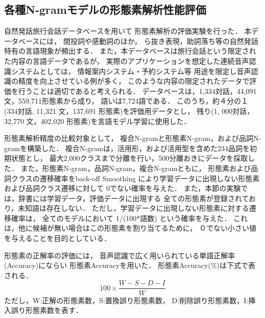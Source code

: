 \subsection{各種N-gramモデルの形態素解析性能評価}
自然発話旅行会話データベース\cite{Morimoto}を用いて
形態素解析の評価実験を行った．
本データベースには，
間投詞や感動詞のほか，
ら抜き表現，助詞落ち等の自然発話特有の言語現象が頻出する．
また，本データベースは旅行会話という限定された内容の言語データであるが，
実際のアプリケーションを想定した連続音声認識システムとしては，
情報案内システム\cite{Tsutsumi}・予約システム\cite{Kawahara}等
用途を限定し音声認識の精度を向上させている例が多く，
このような内容の限定されたデータで評価を行うことは適切であると考えられる．
データベースは，1,334対話，44,091文，559,711形態素から成り，
語いは7,724語である．
このうち，約４分の１(334対話, 11,321 文，137,691 形態素)を評価用データとし，
残り(1, 000対話，32,770 文，402,020 形態素)を言語モデル学習に使用した．

形態素解析精度の比較対象として，
複合N-gramと形態素N-gram，および品詞N-gramを構築した．
複合N-gramは，活用形，および活用型を含めた234品詞を初期状態とし，
最大2,000クラスまで分離を行い，500分離おきにデータを採取した．
また，形態素N-gram，品詞N-gram，複合N-gramともに，
形態素および品詞クラスの遷移確率をback-off Smoothing \cite{Katz}
により学習データに出現しない形態素および品詞クラス遷移に対して
$0$でない確率を与えた．
また，本節の実験では，辞書には学習データ，評価データに出現する
全ての形態素が登録されており，未知語は存在しない．
ただし，学習データに出現しない形態素に対する遷移確率は，
全てのモデルにおいて 1/(100*語数) という確率を与えた．
これは，他に候補が無い場合はこの形態素を割り当てるために，
０でない小さい値を与えることを目的としている．

形態素の正解率の評価には，
音声認識で広く用いられている単語正解率(Accuracy)にならい
形態素Accuracyを用いた．
形態素Accuracy(\%)は下式で表される．
\begin{equation}
100 \times \frac{W-S-D-I}{W}
\end{equation}
ただし，W:正解の形態素数，S:置換誤り形態素数，
D:削除誤り形態素数，I:挿入誤り形態素数を表す．

